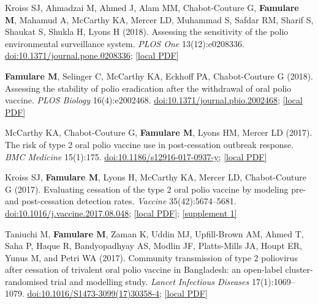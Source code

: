 \documentclass{article}
\begin{document}
\begin{llist}
\begin{items}
\item[{[12]}] Kroiss SJ, Ahmadzai M, Ahmed J, Alam MM, Chabot-Couture G, \textbf{Famulare M}, Mahamud A, McCarthy KA, Mercer LD, Muhammad S, Safdar RM, Sharif S, Shaukat S, Shukla H, Lyons H (2018). Assessing the sensitivity of the polio environmental surveillance system. \emph{PLOS One} 13(12):e0208336. \href{https://doi.org/10.1371/journal.pone.0208336}{doi:10.1371/journal.pone.0208336}; \href{https://famulare.github.io/assets/publication-mirror/journal-12.pdf}{[local PDF]}

\item[{[11]}] \textbf{Famulare M}, Selinger C, McCarthy KA, Eckhoff PA, Chabot-Couture G (2018). Assessing the stability of polio eradication after the withdrawal of oral polio vaccine. \emph{PLOS Biology} 16(4):e2002468. \href{https://doi.org/10.1371/journal.pbio.2002468}{doi:10.1371/journal.pbio.2002468}; \href{https://famulare.github.io/assets/publication-mirror/journal-11.pdf}{[local PDF]}

\item[{[10]}] McCarthy KA, Chabot-Couture G, \textbf{Famulare M}, Lyons HM, Mercer LD (2017). The risk of type 2 oral polio vaccine use in post-cessation outbreak response. \emph{BMC Medicine} 15(1):175. \href{https://doi.org/10.1186/s12916-017-0937-y}{doi:10.1186/s12916-017-0937-y}; \href{https://famulare.github.io/assets/publication-mirror/journal-10.pdf}{[local PDF]}

\item[{[9]}] Kroiss SJ, \textbf{Famulare M}, Lyons H, McCarthy KA, Mercer LD, Chabot-Couture G (2017). Evaluating cessation of the type 2 oral polio vaccine by modeling pre-and post-cessation detection rates.  \emph{Vaccine} 35(42):5674--5681. \href{https://doi.org/10.1016/j.vaccine.2017.08.048}{doi:10.1016/j.vaccine.2017.08.048}; \href{https://famulare.github.io/assets/publication-mirror/Kroiss_et_al_2017_Evaluating_cessation_of_type_2_oral_polio_vaccine.pdf}{[local PDF]}; \href{https://famulare.github.io/assets/publication-mirror/supplements/Kroiss_et_al_2017_supplement.docx}{[supplement 1]}

\item[{[8]}] Taniuchi M, \textbf{Famulare M}, Zaman K, Uddin MJ, Upfill-Brown AM, Ahmed T, Saha P, Haque R, Bandyopadhyay AS, Modlin JF, Platts-Mills JA, Houpt ER, Yunus M, and Petri WA (2017). Community transmission of type 2 poliovirus after cessation of trivalent oral polio vaccine in Bangladesh: an open-label cluster-randomised trial and modelling study.  \emph{Lancet Infectious Diseases} 17(1):1069--1079.  \href{https://doi.org/10.1016/S1473-3099(17)30358-4}{doi:10.1016/S1473-3099(17)30358-4}; \href{https://famulare.github.io/assets/publication-mirror/journal-08.pdf}{[local PDF]}
	

\end{items}
\end{llist}
\end{document}
